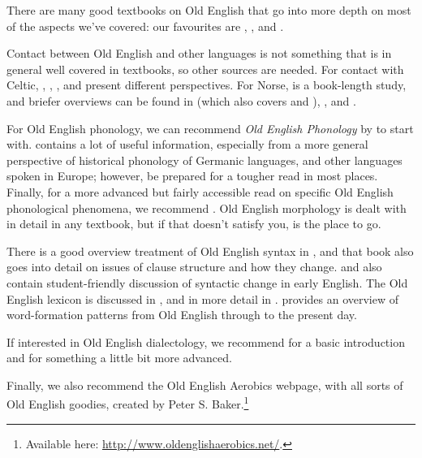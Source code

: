 \largerpage
\begin{furtherreading}
There are many good textbooks on Old English that go into more depth on most of the aspects we've covered: our favourites are \citet{HoggAlcorn2012}, \citet{Smith2009OE}, and \citet{Baker2012}.

Contact between Old English and other languages is not something that is in general well covered in textbooks, so other sources are needed. For contact with Celtic, \citet{Tristram2004}, \citet{Woolf2007}, \citet{Lutz2009}, and \citet{Hickey2012} present different perspectives. For Norse, \citet{Townend2002} is a book-length study, and briefer overviews can be found in \citet{Townend2006} (which also covers  and ), \citet{Lutz2012}, and \citet{Dance2012}.

For Old English phonology, we can recommend \textit{Old English Phonology} by \citet{LassAnderson1975} to start with. \citet{Wrights} contains a lot of useful information, especially from a more general perspective of historical phonology of Germanic languages, and other languages spoken in Europe; however, be prepared for a tougher read in most places. Finally, for a more advanced but fairly accessible read on specific Old English phonological phenomena, we recommend \citet[Chapters 4 and 6]{Minkova2014}. Old English morphology is dealt with in detail in any textbook, but if that doesn't satisfy you, \citet{HoggFulk2011} is the place to go.

There is a good overview treatment of Old English syntax in \citet[Chapter 2]{Fischeretal2000}, and that book also goes into detail on issues of clause structure and how they change. \citet{Los2015} and \citet{FischerDeSmetvanderWurff2017} also contain student-friendly discussion of syntactic change in early English. The Old English lexicon is discussed in \citet[59--73]{Smith2009OE}, and in more detail in \citet{Kastovsky1992}. \citet{Kastovsky2006} provides an overview of word-formation patterns from Old English through to the present day.

If interested in Old English dialectology, we recommend \citet[Chapter 9]{HoggAlcorn2012} for a basic introduction and \citet{Hogg1988} for something a little bit more advanced.

Finally, we also recommend the Old English Aerobics webpage, with all sorts of Old English goodies, created by Peter S. Baker.\footnote{Available here: \url{http://www.oldenglishaerobics.net/}.}
\end{furtherreading}
